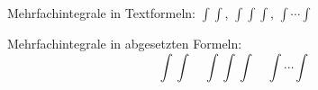 \documentclass{article}
\newcommand{\iint}{\int\!\!\!\int}
\newcommand{\iiint}{\int\!\!\!\int\!\!\!\int}
\newcommand{\idotsint}{\int\cdots\int}
\begin{document}
Mehrfachintegrale in Textformeln: $\iint$, $\iiint$, $\idotsint$

Mehrfachintegrale in abgesetzten Formeln:
\[ \iint\quad\iiint\quad\idotsint \]
\end{document}

